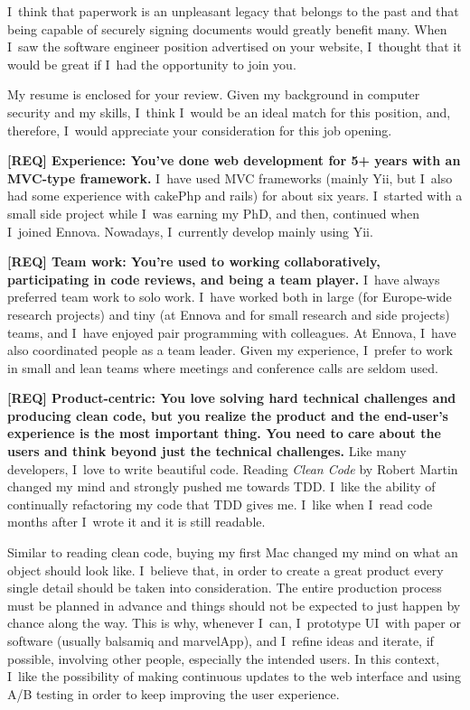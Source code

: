 \documentclass[a4paper,sans]{moderncv} %
\begin{document}
\makelettertitle %

\justify

I~think that paperwork is an unpleasant legacy that belongs to the past and that being capable of securely signing documents would greatly benefit many. When I~saw the software engineer position advertised on your website, I~thought that it would be great if I~had the opportunity to join you.

My resume is enclosed for your review. Given my background in computer security and my skills, I~think I~would be an ideal match for this position, and, therefore, I~would appreciate your consideration for this job opening.

\textbf{[REQ] Experience: You’ve done web development for 5+ years with an MVC-type framework.}
I~have used MVC frameworks (mainly Yii, but I~also had some experience with cakePhp and rails) for about six years. I~started with a small side project while I~was earning my PhD, and then, continued when I~joined Ennova. Nowadays, I~currently develop mainly using Yii.

\textbf{[REQ] Team work: You’re used to working collaboratively, participating in code reviews, and being a team player.}
I~have always preferred team work to solo work. I~have worked both in large (for Europe-wide research projects) and tiny (at Ennova and for small research and side projects) teams, and I~have enjoyed pair programming with colleagues. At Ennova, I~have also coordinated people as a team leader.
Given my experience, I~prefer to work in small and lean teams where meetings and conference calls are seldom used.

\textbf{[REQ] Product-centric: You love solving hard technical challenges and producing clean code, but you realize the product and the end-user’s experience is the most important thing. You need to care about the users and think beyond just the technical challenges.}
Like many developers, I~love to write beautiful code. Reading \textit{Clean Code} by Robert Martin changed my mind and strongly pushed me towards TDD. I~like the ability of continually refactoring my code that TDD gives me. I~like when I~read code months after I~wrote it and it is still readable.

Similar to reading clean code, buying my first Mac changed my mind on what an object should look like.
I~believe that, in order to create a great product every single detail should be taken into consideration.
The entire production process must be planned in advance and things should not be expected to just happen by chance along the way.
This is why, whenever I~can, I~prototype UI~with paper or software (usually balsamiq and marvelApp), and I~refine ideas and iterate, if possible, involving other people, especially the intended users.
In this context, I~like the possibility of making continuous updates to the web interface and using A/B testing in order to keep improving the user experience.
\end{document}
